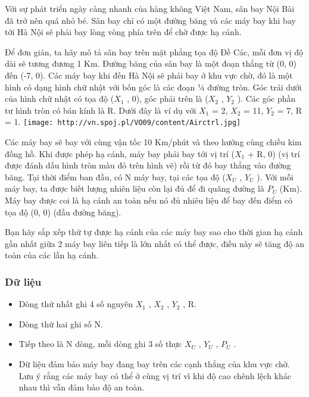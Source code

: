 



   Với sự phát triển ngày càng nhanh của hàng không Việt Nam, sân bay Nội Bài đã trở nên quá nhỏ bé. Sân bay chỉ có một đường băng và các máy bay khi bay tới Hà Nội sẽ phải bay lòng vòng phía trên để chờ được hạ cánh.  

   Để đơn giản, ta hãy mô tả sân bay trên mặt phẳng tọa độ Đề Các, mỗi đơn vị độ dài sẽ tương đương 1 Km. Đường băng của sân bay là một đoạn thẳng từ (0, 0) đến (-7, 0). Các máy bay khi đến Hà Nội sẽ phải bay ở khu vực chờ, đó là một hình có dạng hình chữ nhật với bốn góc là các đoạn ¼ đường tròn. Góc trái dưới của hình chữ nhật có tọa độ ($X_{1}$   , 0), góc phải trên là ($X_{2}$   , $Y_{2}$   ). Các góc phần tư hình tròn có bán kính là R. Dưới đây là ví dụ với $X_{1}$   = 2, $X_{2}$   = 11, $Y_{2}$   = 7, R = 1.  
\texttt{[image: http://vn.spoj.pl/VO09/content/Airctrl.jpg]}

   Các máy bay sẽ bay với cùng vận tốc 10 Km/phút và theo hướng cùng chiều kim đồng hồ. Khi được phép hạ cánh, máy bay phải bay tới vị trí ($X_{1}$   + R, 0) (vị trí được đánh dấu hình tròn màu đỏ trên hình vẽ) rồi từ đó bay thẳng vào đường băng. Tại thời điểm ban đầu, có N máy bay, tại các tọa độ ($X_{U}$   , $Y_{U}$   ). Với mỗi máy bay, ta được biết lượng nhiên liệu còn lại đủ để đi quãng đường là $P_{U}$   (Km). Máy bay được coi là hạ cánh an toàn nếu nó đủ nhiêu liệu để bay đến điểm có tọa độ (0, 0) (đầu đường băng).  

   Bạn hãy sắp xếp thứ tự được hạ cánh của các máy bay sao cho thời gian hạ cánh gần nhất giữa 2 máy bay liên tiếp là lớn nhất có thể được, điều này sẽ tăng độ an toàn của các lần hạ cánh.  

\subsubsection{   Dữ liệu  }
\begin{itemize}
	\item     Dòng thứ nhất ghi 4 số nguyên $X_{1}$    , $X_{2}$    , $Y_{2}$    , R.   
	\item     Dòng thứ hai ghi số N.   
	\item     Tiếp theo là N dòng, mỗi dòng ghi 3 số thực $X_{U}$    , $Y_{U}$    , $P_{U}$    .   
	\item     Dữ liệu đảm bảo máy bay đang bay trên         các cạnh thẳng        của khu vực chờ. Lưu ý rằng các máy bay có thể ở cùng vị trí vì khi độ cao chênh lệch khác nhau thì vẫn đảm bảo độ an toàn.   
\end{itemize}

